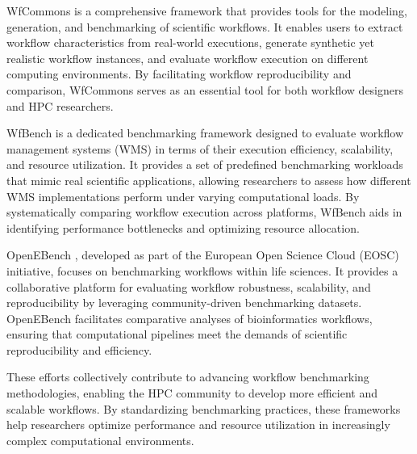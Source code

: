 WfCommons \citep{coleman2022-1} is a comprehensive framework that provides tools for the modeling, generation, and benchmarking of scientific workflows. It enables users to extract workflow characteristics from real-world executions, generate synthetic yet realistic workflow instances, and evaluate workflow execution on different computing environments. By facilitating workflow reproducibility and comparison, WfCommons serves as an essential tool for both workflow designers and HPC researchers.

WfBench \citep{coleman2022-2} is a dedicated benchmarking framework designed to evaluate workflow management systems (WMS) in terms of their execution efficiency, scalability, and resource utilization. It provides a set of predefined benchmarking workloads that mimic real scientific applications, allowing researchers to assess how different WMS implementations perform under varying computational loads. By systematically comparing workflow execution across platforms, WfBench aids in identifying performance bottlenecks and optimizing resource allocation.

OpenEBench \citep{Capella-Gutierrez2017}, developed as part of the European Open Science Cloud (EOSC) initiative, focuses on benchmarking workflows within life sciences. It provides a collaborative platform for evaluating workflow robustness, scalability, and reproducibility by leveraging community-driven benchmarking datasets. OpenEBench facilitates comparative analyses of bioinformatics workflows, ensuring that computational pipelines meet the demands of scientific reproducibility and efficiency.

These efforts collectively contribute to advancing workflow benchmarking methodologies, enabling the HPC community to develop more efficient and scalable workflows. By standardizing benchmarking practices, these frameworks help researchers optimize performance and resource utilization in increasingly complex computational environments.



